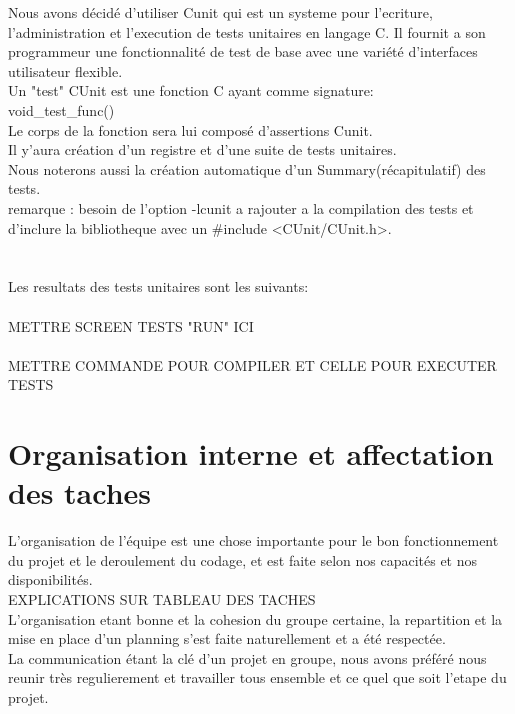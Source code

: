 \documentclass[a4]{article}
\begin{document}
Nous avons décidé d'utiliser Cunit qui est un systeme pour l'ecriture, l'administration et l'execution de tests unitaires
en langage C. Il fournit a son programmeur une fonctionnalité de test de base avec une variété d'interfaces utilisateur flexible.\\
Un "test"  CUnit est une fonction C ayant comme signature:\\
void\_test\_func()\\
Le corps de la fonction sera lui composé d'assertions Cunit.\\
Il y'aura création d'un registre et d'une suite de tests unitaires.\\
Nous noterons aussi la création automatique d'un Summary(récapitulatif) des tests.\\
remarque : besoin de l'option -lcunit a rajouter a la compilation des tests et d'inclure la bibliotheque avec un
\#include <CUnit/CUnit.h>.\\ \\ \\ 

  
Les resultats des tests unitaires sont les suivants:\\ \\ 
METTRE SCREEN TESTS "RUN" ICI \\ \\

		METTRE COMMANDE POUR COMPILER ET CELLE POUR EXECUTER TESTS
	\section{Organisation interne et affectation des taches}
	L'organisation de l'équipe est une chose importante pour le bon fonctionnement du
projet et le deroulement du codage, et est faite selon nos capacités et nos disponibilités.  \\ 
		 EXPLICATIONS SUR TABLEAU DES TACHES \\ 
		
		L'organisation etant bonne et la cohesion du groupe certaine, la repartition et la mise en place d'un planning 
		s'est faite naturellement et a été respectée.  \\
		La communication étant la clé d'un projet en groupe, nous avons préféré
		 nous reunir très regulierement et travailler tous ensemble et ce quel que soit l'etape du projet.
\end{document}
